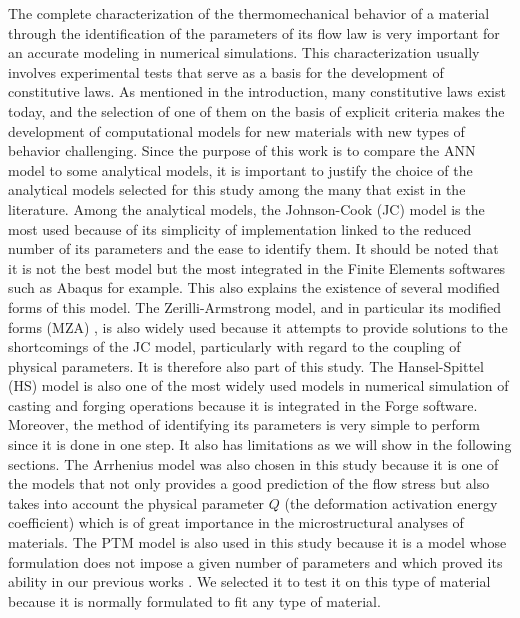\documentclass[twoside,english,1p,final,sort&compress]{elsarticle}
\theoremstyle{plain}
\begin{document}
The complete characterization of the thermomechanical behavior of a material through the identification of the parameters of its flow law is very important for an accurate modeling in numerical simulations.
This characterization usually involves experimental tests that serve as a basis for the development of constitutive laws.
As mentioned in the introduction, many constitutive laws exist today, and the selection of one of them on the basis of explicit criteria makes the development of computational models for new materials with new types of behavior challenging.
Since the purpose of this work is to compare the ANN model to some analytical models, it is important to justify the choice of the analytical models selected for this study among the many that exist in the literature.
Among the analytical models, the Johnson-Cook (JC) model \cite{Johnson-1983} is the most used because of its simplicity of implementation linked to the reduced number of its parameters and the ease to identify them.
It should be noted that it is not the best model but the most integrated in the Finite Elements softwares such as Abaqus for example.
This also explains the existence of several modified forms of this model.
The Zerilli-Armstrong model, and in particular its modified forms (MZA) \cite{NematNasser-2004, Lennon-2004, Muralli-2017, Cheng-2021, Muralli-2021}, is also widely used because it attempts to provide solutions to the shortcomings of the JC model, particularly with regard to the coupling of physical parameters.
It is therefore also part of this study.
The Hansel-Spittel (HS) model \cite{Hensel-1978} is also one of the most widely used models in numerical simulation of casting and forging operations because it is integrated in the Forge software.
Moreover, the method of identifying its parameters is very simple to perform since it is done in one step.
It also has limitations as we will show in the following sections.
The Arrhenius model was also chosen in this study because it is one of the models that not only provides a good prediction of the flow stress but also takes into account the physical parameter $Q$ (the deformation activation energy coefficient) which is of great importance in the microstructural analyses of materials.
The PTM model \cite{TizeMha-2022} is also used in this study because it is a model whose formulation does not impose a given number of parameters and which proved its ability in our previous works \cite{TizeMha-2022}.
We selected it to test it on this type of material because it is normally formulated to fit any type of material.
\end{document}
